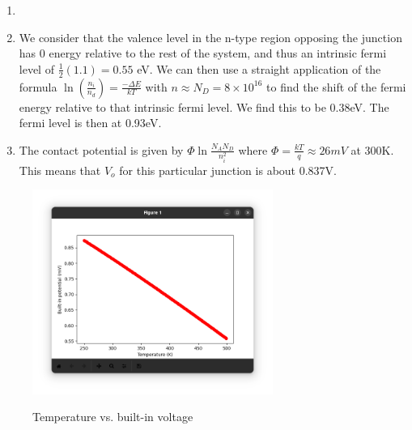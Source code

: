 \documentclass{article}
\begin{document}
\begin{prob}
	\begin{enumerate}
	\item
\item We consider that the valence level in the n-type region opposing the junction has 0 energy relative to the rest of the system, and thus an intrinsic fermi level of $\frac{1}{2}(1.1)= 0.55$ eV.
	We can then use a straight application of the formula $\ln(\frac{n_i}{n_d})=\frac{-\Delta E}{kT}$ with $n\approx N_D=8\times10^{16}$ to find the shift of the fermi energy relative to that intrinsic fermi level. We find this to be 0.38eV.
	The fermi level is then at 0.93eV. 

\item The contact potential is given by $\Phi \ln{\frac{N_AN_D}{n_i^2}}$ where $\Phi =\frac{kT}{q} \approx 26mV$ at 300K. This means that $V_o$ for this particular junction is about 0.837V.
	
\end{enumerate}
\end{prob}
\begin{figure}[h]
\includegraphics[width =0.7\textwidth]{Screenshot from 2023-02-21 12-47-15.png}
	\label{grappph}
	\caption{Temperature vs. built-in voltage}
\end{figure}
\end{document}
